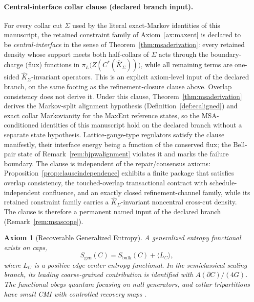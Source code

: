 \documentclass[11pt]{article}
\newtheorem{axiom}{Axiom}
\begin{document}
\paragraph{Central-interface collar clause (declared branch input).}\label{par:cicclause}
For every collar cut \(\Sigma\) used by the literal exact-Markov identities of this manuscript, the retained constraint family of Axiom~\ref{ax:maxent} is declared to be \emph{central-interface} in the sense of Theorem~\ref{thm:msaderivation}: every retained density whose support meets both half-collars of \(\Sigma\) acts through the boundary-charge (flux) functions in \(\pi_L\bigl(Z(C^*(\widehat K_\Sigma))\bigr)\), while all remaining terms are one-sided \(\widehat K_\Sigma\)-invariant operators. This is an explicit axiom-level input of the declared branch, on the same footing as the refinement-closure clause above. Overlap consistency does not derive it. Under this clause, Theorem~\ref{thm:msaderivation} derives the Markov-split alignment hypothesis (Definition~\ref{def:ecaligned}) and exact collar Markovianity for the MaxEnt reference states, so the MSA-conditioned identities of this manuscript hold on the declared branch without a separate state hypothesis. Lattice-gauge-type regulators satisfy the clause manifestly, their interface energy being a function of the conserved flux; the Bell-pair state of Remark~\ref{rem:hjpwalignment} violates it and marks the failure boundary. The clause is independent of the repair/consensus axioms: Proposition~\ref{prop:clauseindependence} exhibits a finite package that satisfies overlap consistency, the touched-overlap transactional contract with schedule-independent confluence, and an exactly closed refinement-channel family, while its retained constraint family carries a \(\widehat K_\Sigma\)-invariant noncentral cross-cut density. The clause is therefore a permanent named input of the declared branch (Remark~\ref{rem:msascope}).

\begin{axiom}[Recoverable Generalized Entropy]\label{ax:entropy}
A generalized entropy functional exists on caps,
\[
S_{\mathrm{gen}}(C)=S_{\mathrm{bulk}}(C)+\langle L_C\rangle,
\]
where \(L_C\) is a positive edge-center entropy functional. In the semiclassical scaling branch, its leading coarse-grained contribution is identified with \(A(\partial C)/(4G)\). The functional obeys quantum focusing on null generators, and collar tripartitions have small CMI with controlled recovery maps \cite{liebRuskai73,petz86,petz88,fawziRenner15}.
\end{axiom}
\end{document}
